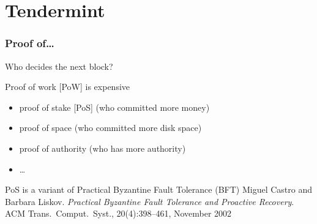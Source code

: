 \documentclass[11pt]{beamer}  %
\begin{document}
\section{Tendermint}

\begin{frame}
  \frametitle{Proof of\ldots}

  \begin{center}
    Who decides the next block?
  \end{center}

  \bigskip

  \begin{greenbox}{Proof of work [PoW] is expensive}
    \begin{itemize}
    \item proof of stake [PoS] (who committed more money)
    \item proof of space (who committed more disk space)
    \item proof of authority (who has more authority)
    \item \ldots
    \end{itemize}
  \end{greenbox}

  \bigskip

  \begin{greenbox}{PoS is a variant of Practical Byzantine Fault Tolerance (BFT)}
    Miguel Castro and Barbara Liskov.
    \emph{Practical Byzantine Fault Tolerance and Proactive Recovery}.
    ACM Trans.\ Comput.\ Syst., 20(4):398–461, November 2002
  \end{greenbox}

\end{frame}
\end{document}
